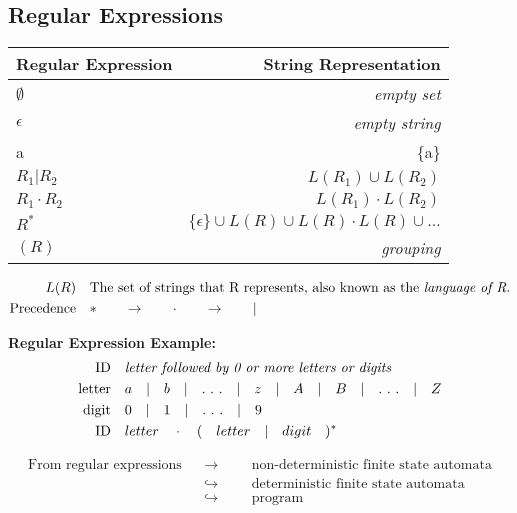 \documentclass{article}
\begin{document}
\subsection{Regular Expressions}

\begin{tabular}{ l | r }
	\textbf{Regular Expression} & \textbf{String Representation} \\
	\hline
	\hline	
	$\emptyset$ & \textit{empty set} \\
	$\epsilon$ & \textit{empty string} \\
	a & \{a\} \\
	$R_1 | R_2$ & $L(R_1) \cup L(R_2)$ \\
	$R_1 \cdot R_2$ & $L(R_1) \cdot L(R_2)$ \\
	$R^*$ & $\{\epsilon\} \cup L(R) \cup L(R) \cdot L(R) \cup ...$ \\
	$(R)$ & \textit{grouping} \\
\end{tabular}

\vspace{1em}
\begin{align*}
L(R) 				&&& \text{The set of strings that R represents, also known as the \textit{language of R}.} \\
\text{Precedence} 	&&& *\qquad\rightarrow\qquad\cdot\qquad\rightarrow\qquad|
\end{align*}

\vspace{1em}
\textbf{Regular Expression Example:}
\begin{align*}
\text{ID} 		&&& \text{\textit{letter followed by 0 or more letters or digits}} \\
\text{letter} 	&&& a\quad | \quad b\quad | \quad .\ .\ . \quad | \quad z\quad | \quad A\quad | \quad B\quad | \quad .\ .\ .\quad | \quad Z \\
\text{digit} 	&&& 0\quad | \quad 1\quad | \quad .\ .\ . \quad | \quad 9 \\
\text{ID} 		&&& letter \quad\cdot\quad (\quad letter\quad | \quad digit\quad)^* \\
\end{align*}

\begin{align*}
\text{From regular expressions}	&&\longrightarrow &&& \text{non-deterministic finite state automata} \\
						 		&&\hookrightarrow &&& \text{deterministic finite state automata} \\
						 		&&\hookrightarrow &&& \text{program} \\
\end{align*}
\end{document}
